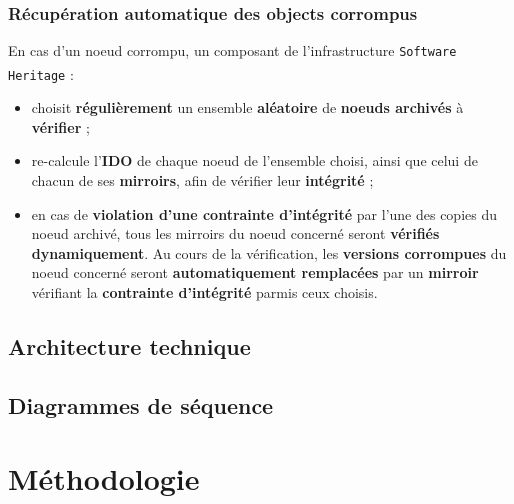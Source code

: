 \documentclass[12pt,a4paper]{report}
\theoremstyle{definition}
\begin{document}
\subsubsection{Récupération automatique des objects corrompus}
En cas d'un noeud corrompu, un composant de l'infrastructure \texttt{Software Heritage}\textsuperscript{\citep{dicosmoWhyAndHow}} :
\begin{itemize}
	\item choisit \textbf{régulièrement} un ensemble \textbf{aléatoire} de \textbf{noeuds archivés} à \textbf{vérifier} ;
	\item re-calcule l'\textbf{IDO} de chaque noeud de l'ensemble choisi, ainsi que celui de chacun de ses \textbf{mirroirs}, afin de vérifier leur \textbf{intégrité} ;
	\item en cas de \textbf{violation d'une contrainte d'intégrité} par l'une des copies du noeud archivé, tous les mirroirs du noeud concerné seront \textbf{vérifiés dynamiquement}. Au cours de la vérification, les \textbf{versions corrompues} du noeud concerné seront \textbf{automatiquement remplacées} par un \textbf{mirroir} vérifiant la \textbf{contrainte d'intégrité} parmis ceux choisis.
\end{itemize}

\subsection{Architecture technique}

\subsection{Diagrammes de séquence}

\section{Méthodologie}
\end{document}
